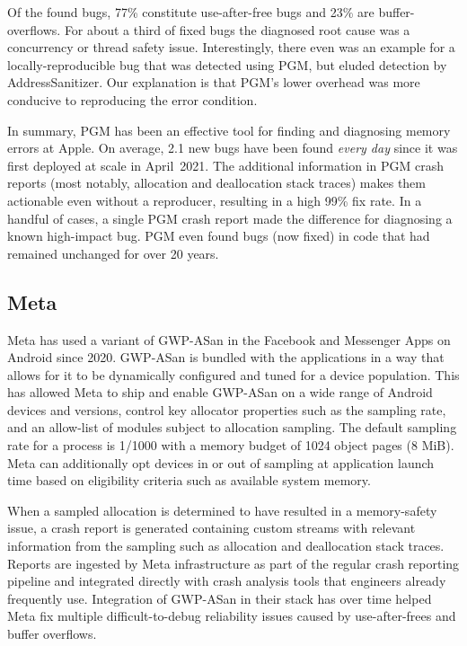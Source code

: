 Of the found bugs, 77\% constitute use-after-free bugs and 23\% are
buffer-overflows.  For about a third of fixed bugs the diagnosed root cause was
a concurrency or thread safety issue.  Interestingly, there even was an example
for a locally-reproducible bug that was detected using PGM, but eluded
detection by AddressSanitizer. Our explanation is that PGM's lower overhead
was more conducive to reproducing the error condition.

In summary, PGM has been an effective tool for finding and diagnosing memory
errors at Apple.  On average, 2.1 new bugs have been found \emph{every day}
since it was first deployed at scale in April~2021.  The additional information
in PGM crash reports (most notably, allocation and deallocation stack traces)
makes them actionable even without a reproducer, resulting in a high 99\% fix
rate.  In a handful of cases, a single PGM crash report made the difference for
diagnosing a known high-impact bug.  PGM even found bugs (now fixed) in code
that had remained unchanged for over 20 years.

\subsection{Meta}

Meta has used a variant of GWP-ASan in the Facebook and Messenger Apps on
Android since 2020. GWP-ASan is bundled with the applications in a way that
allows for it to be dynamically configured and tuned for a device population.
This has allowed Meta to ship and enable GWP-ASan on a wide range of Android
devices and versions, control key allocator properties such as the sampling
rate, and an allow-list of modules subject to allocation sampling. The default
sampling rate for a process is 1/1000 with a memory budget of 1024 object
pages (8 MiB). Meta can additionally opt devices in or out of sampling at
application launch time based on eligibility criteria such as available system
memory.

When a sampled allocation is determined to have resulted in a memory-safety
issue, a crash report is generated containing custom streams with relevant
information from the sampling such as allocation and deallocation stack traces.
Reports are ingested by Meta infrastructure as part of the regular crash
reporting pipeline and integrated directly with crash analysis tools that
engineers already frequently use. Integration of GWP-ASan in their stack has
over time helped Meta fix multiple difficult-to-debug reliability issues caused
by use-after-frees and buffer overflows.

